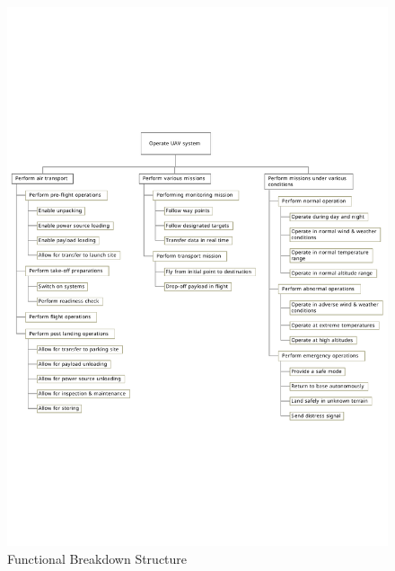 \begin{figure}[htb]
\centering
\includegraphics[width=\textwidth]{./ProjectDescription/Figures/FBS}
\caption{Functional Breakdown Structure}
\label{fig:FBS}
\end{figure}

